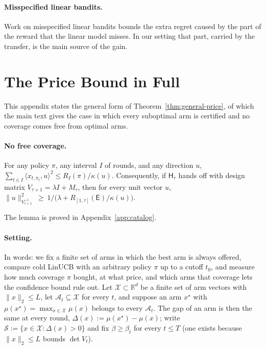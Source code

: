 \documentclass[anon]{alt2027} %
\newif\ifrevmarks\revmarkstrue
\newenvironment{revised}{\ifrevmarks\color{revcolor}\fi}{}
\newcommand{\R}{\mathbb{R}}
\newcommand{\Exp}{\mathsf{E}}
\newcommand{\Hyb}{\mathsf{H}}
\begin{document}
\begin{revised}
\paragraph{Misspecified linear bandits.}
Work on misspecified linear bandits
\citep{ghosh2017misspecified,lattimore2020learning,foster2020adapting}
bounds the extra regret caused by the part of the reward that the linear
model misses. In our setting that part, carried by the transfer, is the main
source of the gain.
\end{revised}

\section{The Price Bound in Full}
\label{app:moved}

This appendix states the general form of Theorem~\ref{thm:general-price},
of which the main text gives the case in which every suboptimal arm is
certified and no coverage comes free from optimal arms.

\paragraph{No free coverage.}
\begin{lemma}
\label{lem:no-free-coverage}
For any policy $\pi$, any interval $I$ of rounds, and any direction $u$,
$\sum_{t\in I}\langle x_{t,\pi_t},u\rangle^2\le R_I(\pi)/\kappa(u)$.
Consequently, if $\Hyb_\tau$ hands off with design matrix $V_{\tau+1}=\lambda I+M_\tau$, then
for every unit vector $u$,
$\|u\|^2_{V_{\tau+1}^{-1}}\ \ge\ 1\big/\bigl(\lambda+R_{[1,\tau]}(\Exp)/\kappa(u)\bigr)$.
\end{lemma}

The lemma is proved in Appendix~\ref{app:catalog}.

\paragraph{Setting.}
In words: we fix a finite set of arms in which the best arm is always
offered, compare cold LinUCB with an arbitrary policy $\pi$ up to a cutoff
$t_0$, and measure how much coverage $\pi$ bought, at what price, and which
arms that coverage lets the confidence bound rule out. Let
$\mathcal X\subset\R^d$ be a finite set of arm vectors with $\|x\|_2\le L$,
let $\mathcal A_t\subseteq\mathcal X$ for every $t$, and suppose an arm
$x^\star$ with $\mu(x^\star)=\max_{x\in\mathcal X}\mu(x)$ belongs to every
$\mathcal A_t$. The gap of an arm is then the same at every round,
$\Delta(x):=\mu(x^\star)-\mu(x)$; write $\mathcal S:=\{x\in\mathcal X:\Delta(x)>0\}$
and fix $\beta\ge\beta_t$ for every $t\le T$ (one exists because
$\|x\|_2\le L$ bounds $\det V_t$).
\end{document}
